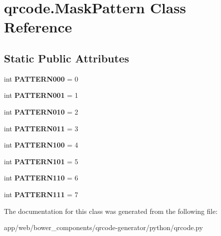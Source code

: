 \hypertarget{classqrcode_1_1_mask_pattern}{}\section{qrcode.\+Mask\+Pattern Class Reference}
\label{classqrcode_1_1_mask_pattern}
\subsection*{Static Public Attributes}
\begin{DoxyCompactItemize}
\item 
\mbox{\label{classqrcode_1_1_mask_pattern_a794d32a6cbb9878c201e207efa45dc2f}} 
int {\bfseries P\+A\+T\+T\+E\+R\+N000} = 0
\item 
\mbox{\label{classqrcode_1_1_mask_pattern_a45dc1d750e3aa1ac6ea178022dff8e4f}} 
int {\bfseries P\+A\+T\+T\+E\+R\+N001} = 1
\item 
\mbox{\label{classqrcode_1_1_mask_pattern_aae6dbfd30dcb8e1c20d180c535144854}} 
int {\bfseries P\+A\+T\+T\+E\+R\+N010} = 2
\item 
\mbox{\label{classqrcode_1_1_mask_pattern_ace3a6a57785ba0808765c38238f15d3d}} 
int {\bfseries P\+A\+T\+T\+E\+R\+N011} = 3
\item 
\mbox{\label{classqrcode_1_1_mask_pattern_a0ea670e9aaedb60c5c137acc5cf3ff8d}} 
int {\bfseries P\+A\+T\+T\+E\+R\+N100} = 4
\item 
\mbox{\label{classqrcode_1_1_mask_pattern_a0924074c33d45d83e68044403b80a248}} 
int {\bfseries P\+A\+T\+T\+E\+R\+N101} = 5
\item 
\mbox{\label{classqrcode_1_1_mask_pattern_a59a57b8b897aef9a6f543c6f31ab3fb0}} 
int {\bfseries P\+A\+T\+T\+E\+R\+N110} = 6
\item 
\mbox{\label{classqrcode_1_1_mask_pattern_affb6d8e5915a1fe9d855799b263f963a}} 
int {\bfseries P\+A\+T\+T\+E\+R\+N111} = 7
\end{DoxyCompactItemize}


The documentation for this class was generated from the following file\+:\begin{DoxyCompactItemize}
\item 
app/web/bower\+\_\+components/qrcode-\/generator/python/qrcode.\+py\end{DoxyCompactItemize}
